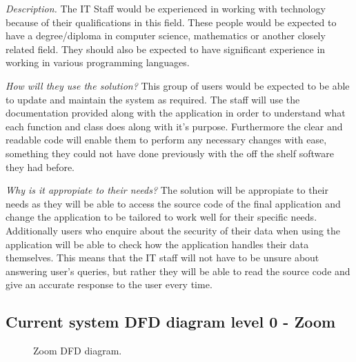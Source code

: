 \textit{Description.}
The IT Staff would be experienced in working with technology
because of their qualifications in this field. These people 
would be expected to have a degree/diploma in computer science,
mathematics or another closely related field. They should also 
be expected to have significant experience in working in 
various programming languages. \vspace{0.2cm}

\textit{How will they use the solution?}
This group of users would be expected to be able to update and
maintain the system as required. The staff will use the
documentation provided along with the application in order to
understand what each function and class does along with it's
purpose. Furthermore the clear and readable code will enable
them to perform any necessary changes with ease, something
they could not have done previously with the off the shelf
software they had before. \vspace{0.2cm}

\textit{Why is it appropiate to their needs?}
The solution will be appropiate to their needs as they will be
able to access the source code of the final application and 
change the application to be tailored to work well for their 
specific needs. Additionally users who enquire about the 
security of their data when using the application will be able
to check how the application handles their data themselves.
This means that the IT staff will not have to be unsure about
answering user's queries, but rather they will be able to read
the source code and give an accurate response to the user every
time.

\subsection{Current system DFD diagram level 0 - Zoom}
\label{sec:currdfd}

\begin{figure}[h]
\label{fig:dfd}
\centering
{}

\caption{Zoom DFD diagram.}
\end{figure}

